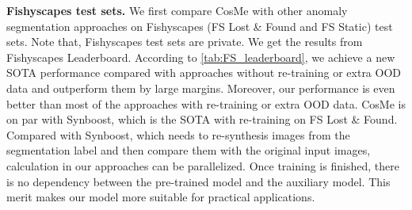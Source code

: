 \documentclass[10pt,twocolumn,letterpaper]{article}
\begin{document}
\noindent\textbf{Fishyscapes test sets.}
We first compare CosMe with other anomaly segmentation approaches on Fishyscapes (FS Lost \& Found and FS Static) test sets. Note that, Fishyscapes test sets are private. We get the results from Fishyscapes Leaderboard. According to \cref{tab:FS_leaderboard}, we achieve a new SOTA performance compared with approaches without re-training or extra OOD data and outperform them by large margins. Moreover, our performance is even better than most of the approaches with re-training or extra OOD data. CosMe is on par with Synboost, which is the SOTA with re-training on FS Lost \& Found. Compared with Synboost, which needs to re-synthesis images from the segmentation label and then compare them with the original input images, calculation in our approaches can be parallelized. Once training is finished, there is no dependency between the pre-trained model and the auxiliary model. This merit makes our model more suitable for practical applications.


 \begin{table*}[ht!]
  \centering
  \caption{Comparison on Fishyscapes validation sets and Road Anomaly.  and  indicate re-training and extra OOD data, respectively.}
  \label{tab:fishyscapes_val}
  \vspace{-2mm}
\end{table*}
\end{document}

